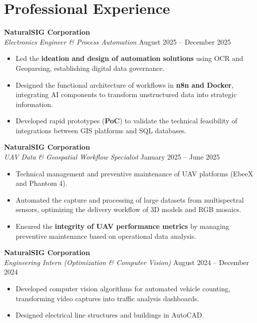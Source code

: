 \documentclass[11pt,a4paper]{article}
\begin{document}
\section*{Professional Experience}

\textbf{NaturalSIG Corporation} \\
\textit{Electronics Engineer & Process Automation} \hfill August 2025 -- December 2025

\begin{itemize}[leftmargin=*]
    \item Led the \textbf{ideation and design of automation solutions} using OCR and Geoparsing, establishing digital data governance.
    \item Designed the functional architecture of workflows in \textbf{n8n and Docker}, integrating AI components to transform unstructured data into strategic information.
    \item Developed rapid prototypes (\textbf{PoC}) to validate the technical feasibility of integrations between GIS platforms and SQL databases.
\end{itemize}

\vspace{2mm}

\textbf{NaturalSIG Corporation} \\
\textit{UAV Data & Geospatial Workflow Specialist} \hfill January 2025 -- June 2025

\begin{itemize}[leftmargin=*]
    \item Technical management and preventive maintenance of UAV platforms (EbeeX and Phantom 4).
    \item Automated the capture and processing of large datasets from multispectral sensors, optimizing the delivery workflow of 3D models and RGB mosaics.
    \item Ensured the \textbf{integrity of UAV performance metrics} by managing preventive maintenance based on operational data analysis.
\end{itemize}

\vspace{2mm}

\textbf{NaturalSIG Corporation} \\
\textit{Engineering Intern (Optimization & Computer Vision)} \hfill August 2024 -- December 2024

\begin{itemize}[leftmargin=*]
    \item Developed computer vision algorithms for automated vehicle counting, transforming video captures into traffic analysis dashboards.
    \item Designed electrical line structures and buildings in AutoCAD.
\end{itemize}
\end{document}
